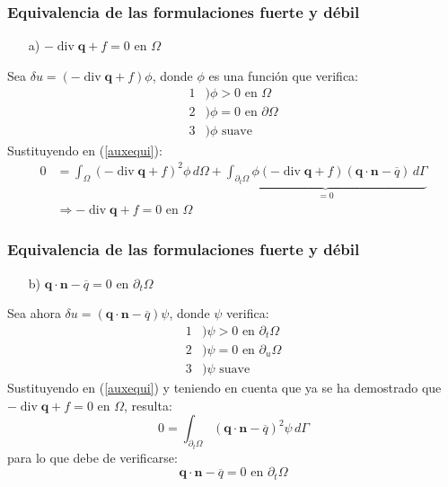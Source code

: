 \documentclass[handout]{beamer}
\begin{document}
\begin{frame}
\frametitle{Equivalencia de las formulaciones fuerte y débil}
\begin{itemize}
\item[a)] $-\operatorname{div} \bm{q} +f=0 \textrm{ en } \Omega$
\end{itemize}
Sea $\delta u=(-\operatorname{div} \bm{q} +f) \phi$,
donde $\phi$ es una función que verifica:
\begin{align*}
1&) \phi>0 \textrm{ en } \Omega \\
2&) \phi=0 \textrm{ en } \partial \Omega \\
3&) \phi \textrm{ suave }
\end{align*}
Sustituyendo en (\ref{auxequi}):
\begin{align*}
0&=\int_{\Omega} \left(-\operatorname{div} \bm{q} +f \right)^2 \phi \, d\Omega+
\underbrace{\int_{\partial_t \Omega} \phi \left(-\operatorname{div} \bm{q} +f \right)
\left( \bm{q}\cdot \bm{n} - \overline{q} \right) \,d \Gamma}_{=0} \\
&\Rightarrow
-\operatorname{div} \bm{q} +f=0 \textrm{ en } \Omega
\end{align*}
\end{frame}
\begin{frame}
\frametitle{Equivalencia de las formulaciones fuerte y débil}
\begin{itemize}
\item[b)] $\bm{q}\cdot \bm{n} - \overline{q}=0 \textrm{ en } \partial_t \Omega$
\end{itemize}
Sea ahora $\delta u=(\bm{q}\cdot \bm{n} - \overline{q}) \psi$,
donde $\psi$ verifica:
\begin{align*}
1&) \psi>0 \textrm{ en } \partial_t \Omega \\
2&) \psi=0 \textrm{ en } \partial_u \Omega \\
3&) \psi \textrm{ suave }
\end{align*}
Sustituyendo en (\ref{auxequi}) y teniendo en cuenta que ya se ha demostrado
que $-\operatorname{div} \bm{q} +f=0$ en $\Omega$, resulta:
\begin{equation*}
0=\int_{\partial_t \Omega} \left(\bm{q}\cdot \bm{n} - \overline{q}
\right)^2 \psi \, d \Gamma
\end{equation*}
para lo que debe de verificarse:
\begin{equation*}
\bm{q}\cdot \bm{n} - \overline{q}=0 \textrm{ en } \partial_t \Omega
\end{equation*}
\end{frame}
\end{document}
